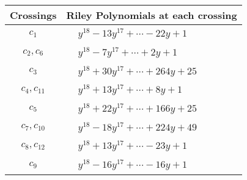 \documentclass[1p]{elsarticle_modified}
\theoremstyle{definition}
\begin{document}
\begin{tabular}{m{50pt}|m{274pt}}
Crossings & \hspace{64pt}Riley Polynomials at each crossing \\
\hline $$\begin{aligned}c_{1}\end{aligned}$$&$\begin{aligned}
&y^{18}-13 y^{17}+\cdots-22 y+1
\end{aligned}$\\
\hline $$\begin{aligned}c_{2},c_{6}\end{aligned}$$&$\begin{aligned}
&y^{18}-7 y^{17}+\cdots+2 y+1
\end{aligned}$\\
\hline $$\begin{aligned}c_{3}\end{aligned}$$&$\begin{aligned}
&y^{18}+30 y^{17}+\cdots+264 y+25
\end{aligned}$\\
\hline $$\begin{aligned}c_{4},c_{11}\end{aligned}$$&$\begin{aligned}
&y^{18}+13 y^{17}+\cdots+8 y+1
\end{aligned}$\\
\hline $$\begin{aligned}c_{5}\end{aligned}$$&$\begin{aligned}
&y^{18}+22 y^{17}+\cdots+166 y+25
\end{aligned}$\\
\hline $$\begin{aligned}c_{7},c_{10}\end{aligned}$$&$\begin{aligned}
&y^{18}-18 y^{17}+\cdots+224 y+49
\end{aligned}$\\
\hline $$\begin{aligned}c_{8},c_{12}\end{aligned}$$&$\begin{aligned}
&y^{18}+13 y^{17}+\cdots-23 y+1
\end{aligned}$\\
\hline $$\begin{aligned}c_{9}\end{aligned}$$&$\begin{aligned}
&y^{18}-16 y^{17}+\cdots-16 y+1
\end{aligned}$\\
\hline
\end{tabular}\\~\\
\end{document}
